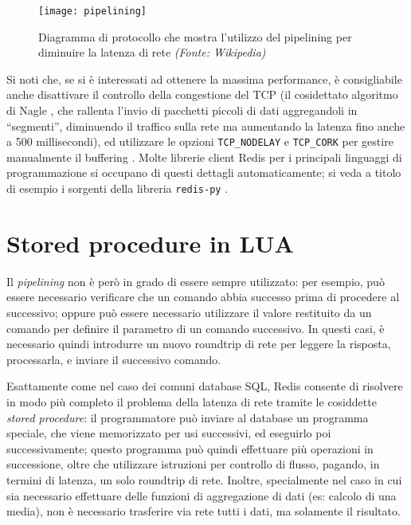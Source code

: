 \begin{figure}
	\centering
		\texttt{[image: pipelining]}
	\caption{Diagramma di protocollo che mostra l'utilizzo del pipelining per diminuire la latenza
	di rete \emph{(Fonte: Wikipedia)}}
\end{figure}

Si noti che, se si è interessati ad ottenere la massima performance, è consigliabile anche
disattivare il controllo della congestione del TCP (il cosidettato algoritmo di Nagle \cite{rfc896},
che rallenta l'invio di pacchetti piccoli di dati aggregandoli in ``segmenti'', diminuendo il
traffico sulla rete ma aumentando la latenza fino anche a 500 millisecondi), ed utilizzare le
opzioni \verb|TCP_NODELAY| e \verb|TCP_CORK| per gestire manualmente il buffering \cite{tcp-cork}.
Molte librerie client Redis per i principali linguaggi di programmazione si occupano di questi
dettagli automaticamente; si veda a titolo di esempio i sorgenti della libreria \verb|redis-py|
\cite{tcp-cork-redispy}.

\section{Stored procedure in LUA}
\label{redislua}

Il \emph{pipelining} non è però in grado di essere sempre utilizzato: per esempio, può essere
necessario verificare che un comando abbia successo prima di procedere al successivo; oppure
può essere necessario utilizzare il valore restituito da un comando per definire il parametro 
di un comando successivo. In questi casi, è necessario quindi introdurre un nuovo roundtrip di
rete per leggere la risposta, processarla, e inviare il successivo comando.

Esattamente come nel caso dei comuni database SQL, Redis consente di risolvere in modo più completo
il problema della latenza di rete tramite le cosiddette \emph{stored procedure}: il programmatore
può inviare al database un programma speciale, che viene memorizzato per usi successivi, ed
eseguirlo poi successivamente; questo programma può quindi effettuare più operazioni in successione,
oltre che utilizzare istruzioni per controllo di flusso, pagando, in termini di latenza, un solo
roundtrip di rete. Inoltre, specialmente nel caso in cui sia necessario effettuare delle funzioni di
aggregazione di dati (es: calcolo di una media), non è necessario trasferire via rete tutti i dati,
ma solamente il risultato.

